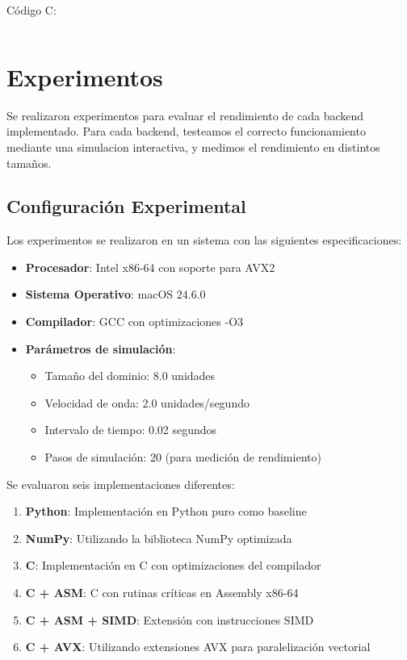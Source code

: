 \documentclass[a4paper]{article}
\begin{document}
Código C:
\begin{verbatim}
\end{verbatim}

\section{Experimentos}

Se realizaron experimentos para evaluar el rendimiento de cada backend implementado. Para cada backend, testeamos el correcto funcionamiento mediante una simulacion interactiva, y medimos
el rendimiento en distintos tamaños.

\subsection{Configuración Experimental}

Los experimentos se realizaron en un sistema con las siguientes especificaciones:
\begin{itemize}
    \item \textbf{Procesador}: Intel x86-64 con soporte para AVX2
    \item \textbf{Sistema Operativo}: macOS 24.6.0
    \item \textbf{Compilador}: GCC con optimizaciones -O3
    \item \textbf{Parámetros de simulación}:
          \begin{itemize}
              \item Tamaño del dominio: 8.0 unidades
              \item Velocidad de onda: 2.0 unidades/segundo
              \item Intervalo de tiempo: 0.02 segundos
              \item Pasos de simulación: 20 (para medición de rendimiento)
          \end{itemize}
\end{itemize}

Se evaluaron seis implementaciones diferentes:
\begin{enumerate}
    \item \textbf{Python}: Implementación en Python puro como baseline
    \item \textbf{NumPy}: Utilizando la biblioteca NumPy optimizada
    \item \textbf{C}: Implementación en C con optimizaciones del compilador
    \item \textbf{C + ASM}: C con rutinas críticas en Assembly x86-64
    \item \textbf{C + ASM + SIMD}: Extensión con instrucciones SIMD
    \item \textbf{C + AVX}: Utilizando extensiones AVX para paralelización vectorial
\end{enumerate}
\end{document}
